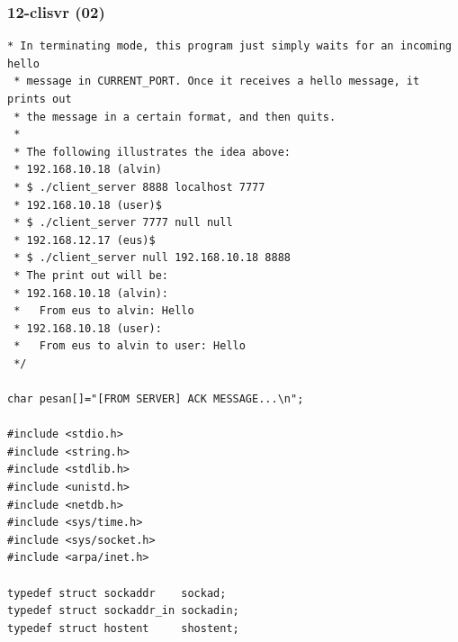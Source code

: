 \documentclass[aspectratio=169, xcolor=table, notheorems, hyperref={pdfpagelabels=false}]{beamer}
\begin{document}
\begin{frame}[fragile]
\frametitle{12-clisvr (02)}
\begin{lstlisting}[basicstyle=\ttfamily\tiny]
 * In terminating mode, this program just simply waits for an incoming hello
 * message in CURRENT_PORT. Once it receives a hello message, it prints out
 * the message in a certain format, and then quits.
 *
 * The following illustrates the idea above:
 * 192.168.10.18 (alvin)
 * $ ./client_server 8888 localhost 7777
 * 192.168.10.18 (user)$
 * $ ./client_server 7777 null null
 * 192.168.12.17 (eus)$
 * $ ./client_server null 192.168.10.18 8888
 * The print out will be:
 * 192.168.10.18 (alvin):
 *   From eus to alvin: Hello
 * 192.168.10.18 (user):
 *   From eus to alvin to user: Hello
 */

char pesan[]="[FROM SERVER] ACK MESSAGE...\n";

#include <stdio.h>
#include <string.h>
#include <stdlib.h>
#include <unistd.h>
#include <netdb.h>
#include <sys/time.h>
#include <sys/socket.h>
#include <arpa/inet.h>

typedef struct sockaddr    sockad;
typedef struct sockaddr_in sockadin;
typedef struct hostent     shostent;

\end{lstlisting}
\end{frame}
\end{document}
